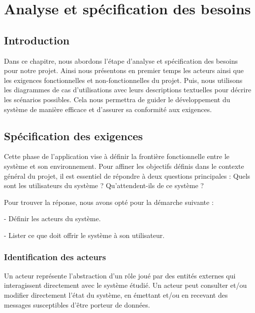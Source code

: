 
\chapter{Analyse et spécification des besoins}
\label{chap:Analyse et spécification des besoins}

\section*{Introduction}

Dans ce chapitre, nous abordons l’étape d’analyse et spécification des besoins pour notre projet. Ainsi nous présentons en premier temps les acteurs ainsi que les exigences fonctionnelles et non-fonctionnelles du projet. Puis, nous utilisons les diagrammes de cas d’utilisations avec leurs descriptions textuelles pour décrire les scénarios possibles. Cela nous permettra de guider le développement du système de manière efficace et d’assurer sa conformité aux exigences.

\pagebreak

\section{Spécification des exigences}

Cette phase de l’application vise à définir la frontière fonctionnelle entre le système et son environnement. Pour affiner les objectifs définis dans le contexte général du projet, il est essentiel de répondre à deux questions principales : Quels sont les utilisateurs du système ? Qu'attendent-ils de ce système ?

Pour trouver la réponse, nous avons opté pour la démarche suivante : 

- Définir les acteurs du système. 

- Lister ce que doit offrir le système à son utilisateur.


\subsection{Identification des acteurs}

Un acteur représente l’abstraction d’un rôle joué par des entités externes qui
interagissent directement avec le système étudié. Un acteur peut consulter et/ou
modifier directement l’état du système, en émettant et/ou en recevant des messages
susceptibles d'être porteur de données.

